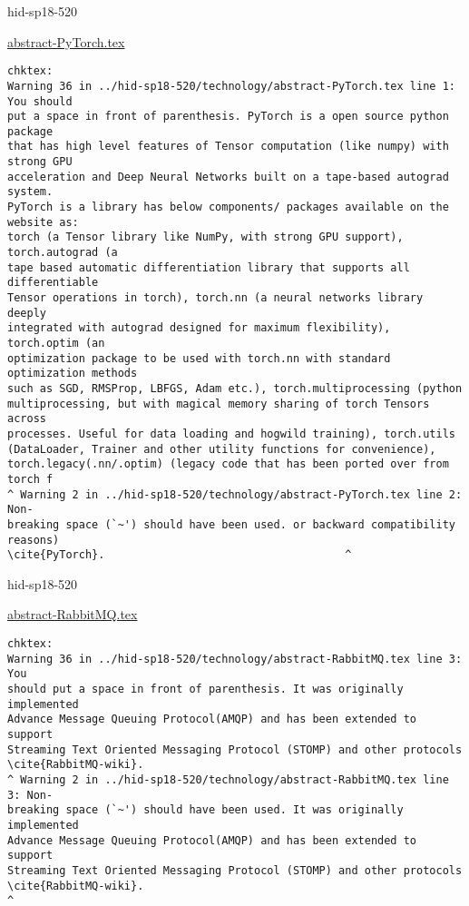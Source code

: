 \begin{IU}

hid-sp18-520

\href{https://github.com/cloudmesh-community/hid-sp18-520/blob/master//technology/abstract-PyTorch.tex}{abstract-PyTorch.tex}

\begin{tiny}
\begin{verbatim}
chktex:
Warning 36 in ../hid-sp18-520/technology/abstract-PyTorch.tex line 1: You should
put a space in front of parenthesis. PyTorch is a open source python package
that has high level features of Tensor computation (like numpy) with strong GPU
acceleration and Deep Neural Networks built on a tape-based autograd system.
PyTorch is a library has below components/ packages available on the website as:
torch (a Tensor library like NumPy, with strong GPU support), torch.autograd (a
tape based automatic differentiation library that supports all differentiable
Tensor operations in torch), torch.nn (a neural networks library deeply
integrated with autograd designed for maximum flexibility), torch.optim (an
optimization package to be used with torch.nn with standard optimization methods
such as SGD, RMSProp, LBFGS, Adam etc.), torch.multiprocessing (python
multiprocessing, but with magical memory sharing of torch Tensors across
processes. Useful for data loading and hogwild training), torch.utils
(DataLoader, Trainer and other utility functions for convenience),
torch.legacy(.nn/.optim) (legacy code that has been ported over from torch f
^ Warning 2 in ../hid-sp18-520/technology/abstract-PyTorch.tex line 2: Non-
breaking space (`~') should have been used. or backward compatibility reasons)
\cite{PyTorch}.                                     ^
\end{verbatim}
\end{tiny}
\end{IU}



\begin{IU}

hid-sp18-520

\href{https://github.com/cloudmesh-community/hid-sp18-520/blob/master//technology/abstract-RabbitMQ.tex}{abstract-RabbitMQ.tex}

\begin{tiny}
\begin{verbatim}
chktex:
Warning 36 in ../hid-sp18-520/technology/abstract-RabbitMQ.tex line 3: You
should put a space in front of parenthesis. It was originally implemented
Advance Message Queuing Protocol(AMQP) and has been extended to support
Streaming Text Oriented Messaging Protocol (STOMP) and other protocols
\cite{RabbitMQ-wiki}.
^ Warning 2 in ../hid-sp18-520/technology/abstract-RabbitMQ.tex line 3: Non-
breaking space (`~') should have been used. It was originally implemented
Advance Message Queuing Protocol(AMQP) and has been extended to support
Streaming Text Oriented Messaging Protocol (STOMP) and other protocols
\cite{RabbitMQ-wiki}.
^
\end{verbatim}
\end{tiny}
\end{IU}

